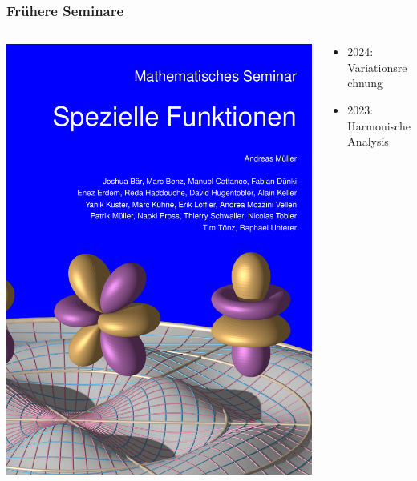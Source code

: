 %
%
%
\bgroup
\begin{frame}[t]
\setlength{\abovedisplayskip}{5pt}
\setlength{\belowdisplayskip}{5pt}
\frametitle{Frühere Seminare}
\vspace{-15pt}
\begin{columns}[t,onlytextwidth]
\begin{column}{0.44\textwidth}
\begin{center}
\includegraphics[width=\textwidth]{../slides/0/front.pdf}
\end{center}
\end{column}
\begin{column}{0.52\textwidth}
\begin{itemize}
\item {\color{gray}2024: Variationsrechnung}
\item 2023: Harmonische Analysis

\end{itemize}
\end{column}
\end{columns}
\end{frame}
